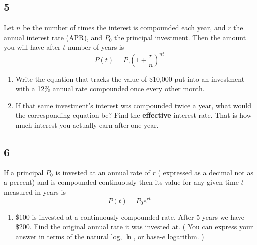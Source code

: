\documentclass[11pt]{amsart}
\begin{document}
\newpage
\subsection*{5} Let $n$ be the number of times the interest is compounded each year,
and $r$ the annual interest rate (APR), and $P_0$ the principal investment.  Then the amount you will have after $t$ number of years is
$$ P(t) = P_0 \left( 1+\frac{r}{n}\right)^{nt} $$
\begin{enumerate}[a]
\item Write the equation that tracks the value of \$10,000 put into an investment with a 12\% annual rate compounded once every other month. 
\item If that same investment's interest was compounded twice a year, what would the corresponding equation be? Find the {\bf effective} interest
rate. That is how much interest you actually earn after one year. 
\end{enumerate}

\vspace{7cm}

\subsection*{6} %
If a principal $P_0$ is invested at an annual rate of $r$ ( expressed as a decimal not as a percent) and is compounded 
continuously then its value for any given time $t$ measured in years is 
$$P(t) = P_0e^{rt}$$
\begin{enumerate}[a]
\item \$100 is invested at a continuously compounded rate. After 5 years we have \$200.  Find the original annual rate
it was invested at.  ( You can express your answer in terms of the natural log, $\ln$, or base-$e$ logarithm. ) \
\end{enumerate}
\end{document}
